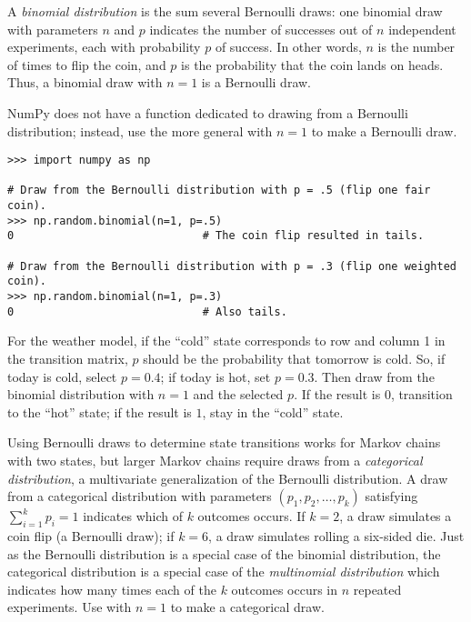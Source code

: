 A \emph{binomial distribution} is the sum several Bernoulli draws: one binomial draw with parameters $n$ and $p$ indicates the number of successes out of $n$ independent experiments, each with probability $p$ of success.
In other words, $n$ is the number of times to flip the coin, and $p$ is the probability that the coin lands on heads.
Thus, a binomial draw with $n=1$ is a Bernoulli draw.

NumPy does not have a function dedicated to drawing from a Bernoulli distribution; instead, use the more general  with $n=1$ to make a Bernoulli draw.

\begin{lstlisting}
>>> import numpy as np

# Draw from the Bernoulli distribution with p = .5 (flip one fair coin).
>>> np.random.binomial(n=1, p=.5)
0                             # The coin flip resulted in tails.

# Draw from the Bernoulli distribution with p = .3 (flip one weighted coin).
>>> np.random.binomial(n=1, p=.3)
0                             # Also tails.
\end{lstlisting}

For the weather model, if the ``cold'' state corresponds to row and column 1 in the transition matrix, $p$ should be the probability that tomorrow is cold.
So, if today is cold, select $p=0.4$; if today is hot, set $p=0.3$.
Then draw from the binomial distribution with $n=1$ and the selected $p$.
If the result is $0$, transition to the ``hot'' state; if the result is $1$, stay in the ``cold'' state.


Using Bernoulli draws to determine state transitions works for Markov chains with two states, but larger Markov chains require draws from a \emph{categorical distribution}, a multivariate generalization of the Bernoulli distribution.
A draw from a categorical distribution with parameters $(p_1,p_2,\ldots,p_k)$ satisfying $\sum_{i=1}^k p_i = 1$ indicates which of $k$ outcomes occurs.
If $k=2$, a draw simulates a coin flip (a Bernoulli draw); if $k=6$, a draw simulates rolling a six-sided die. %
Just as the Bernoulli distribution is a special case of the binomial distribution, the categorical distribution is a special case of the \emph{multinomial distribution} which indicates how many times each of the $k$ outcomes occurs in $n$ repeated experiments.
Use  with $n = 1$ to make a categorical draw.

